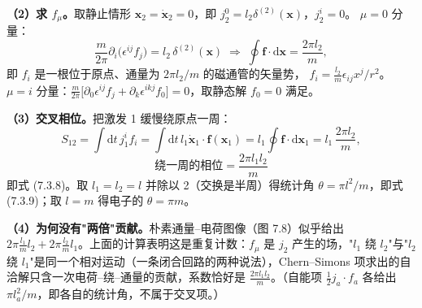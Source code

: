 \textbf{（2）求 $f_\mu$。}取静止情形 $\pmb{x}_2=\dot{\pmb{x}}_2=0$，即 $j_2^0=l_2\delta^{(2)}(\pmb{x})$，$j_2^i=0$。
$\mu=0$ 分量：
\begin{equation*}
\frac{m}{2\pi}\partial_i\big(\epsilon^{ij}f_j\big)=l_2\,\delta^{(2)}(\pmb{x})
\;\Longrightarrow\;
\oint\pmb{f}\cdot\mathrm{d}\pmb{x}=\frac{2\pi l_2}{m},
\end{equation*}
即 $f_i$ 是一根位于原点、通量为 $2\pi l_2/m$ 的磁通管的矢量势，
$f_i=\frac{l_2}{m}\epsilon_{ij}x^j/r^2$。
$\mu=i$ 分量：$\frac{m}{2\pi}\big[\partial_0\epsilon^{ij}f_j+\partial_k\epsilon^{ikj}f_0\big]=0$，取静态解 $f_0=0$ 满足。

\textbf{（3）交叉相位。}把激发 1 缓慢绕原点一周：
\begin{equation*}
S_{12}=\int\mathrm{d}t\,j_1^i f_i=\int\mathrm{d}t\,l_1\dot{\pmb{x}}_1\cdot\pmb{f}(\pmb{x}_1)
=l_1\oint\pmb{f}\cdot\mathrm{d}\pmb{x}_1
=l_1\,\frac{2\pi l_2}{m},
\end{equation*}
\begin{equation*}
\boxed{\;\text{绕一周的相位}=\frac{2\pi l_1l_2}{m}\;}
\end{equation*}
即式 (7.3.8)。取 $l_1=l_2=l$ 并除以 2（交换是半周）得统计角 $\theta=\pi l^2/m$，即式 (7.3.9)；取 $l=m$ 得电子的 $\theta=\pi m$。

\textbf{（4）为何没有"两倍"贡献。}朴素通量--电荷图像（图 7.8）似乎给出 $2\pi\frac{l_1}{m}l_2+2\pi\frac{l_2}{m}l_1$。上面的计算表明这是重复计数：$f_\mu$ 是 $j_2$ 产生的场，"$l_1$ 绕 $l_2$"与"$l_2$ 绕 $l_1$"是同一个相对运动（一条闭合回路的两种说法），Chern--Simons 项求出的自洽解只含一次电荷--绕--通量的贡献，系数恰好是 $\frac{2\pi l_1l_2}{m}$。（自能项 $\frac12j_a\cdot f_a$ 各给出 $\pi l_a^2/m$，即各自的统计角，不属于交叉项。）

